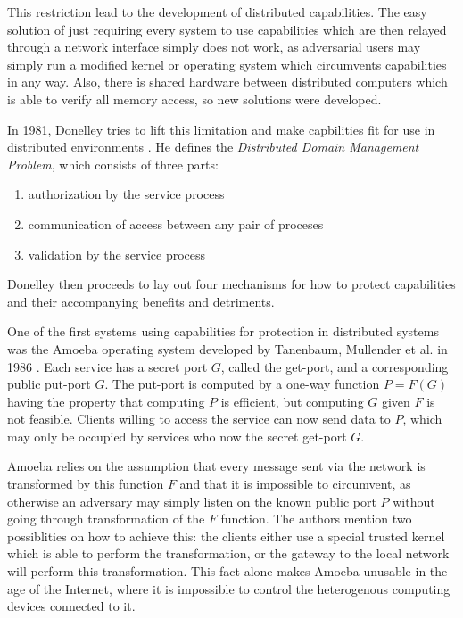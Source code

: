 This restriction lead to the development of distributed capabilities.
The easy solution of just requiring every system to use capabilities which are then relayed through a network interface simply does not work, as adversarial users may simply run a modified kernel or operating system which circumvents capabilities in any way.
Also, there is shared hardware between distributed computers which is able to verify all memory access, so new solutions were developed.

In 1981, Donelley tries to lift this limitation and make capbilities fit for use in distributed environments \cite{donnelley1981managing}.
He defines the \emph{Distributed Domain Management Problem}, which consists of three parts:
\begin{enumerate}
    \item authorization by the service process
    \item communication of access between any pair of proceses
    \item validation by the service process
\end{enumerate}
Donelley then proceeds to lay out four mechanisms for how to protect capabilities and their accompanying benefits and detriments.


One of the first systems using capabilities for protection in distributed systems was the Amoeba operating system developed by Tanenbaum, Mullender et al. in 1986 \cite{tanenbaum1986using,mullender1990amoeba}.
Each service has a secret port $G$, called the get-port, and a corresponding public put-port $G$.
The put-port is computed by a one-way function $P = F(G)$ having the property that computing $P$ is efficient, but computing $G$ given $F$ is not feasible.
Clients willing to access the service can now send data to $P$, which may only be occupied by services who now the secret get-port $G$.

Amoeba relies on the assumption that every message sent via the network is transformed by this function $F$ and that it is impossible to circumvent, as otherwise an adversary may simply listen on the known public port $P$ without going through transformation of the $F$ function.
The authors mention two possiblities on how to achieve this: the clients either use a special trusted kernel which is able to perform the transformation, or the gateway to the local network will perform this transformation.
This fact alone makes Amoeba unusable in the age of the Internet, where it is impossible to control the heterogenous computing devices connected to it.

